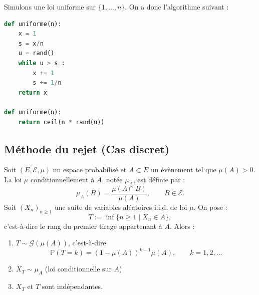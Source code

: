\begin{example}
    Simulons une loi uniforme sur $\{1, \dots, n\}$. 
    On a donc l'algorithme suivant : 

    \begin{lstlisting}[language=Python]
def uniforme(n):
    x = 1 
    s = x/n 
    u = rand() 
    while u > s : 
        x += 1
        s += 1/n 
    return x 

def uniforme(n):
    return ceil(n * rand(u))
    \end{lstlisting}
\end{example}

\subsection{Méthode du rejet (Cas discret)}

\begin{proposition}
    Soit $(E, \mathcal{E}, \mu)$ un espace probabilisé et $A \subset E$ un évènement tel que $\mu(A) > 0$. 
    La loi $\mu$ conditionnellement à $A$, notée $\mu_A$, est définie par :
    \[
        \mu_A(B) = \frac{\mu(A \cap B)}{\mu(A)}, \qquad B \in \mathcal{E}.
    \]
    Soit $(X_n)_{n \geqslant 1}$ une suite de variables aléatoires i.i.d. de loi $\mu$. 
    On pose :
    \[
        T := \inf \{ n \geqslant 1 \mid X_n \in A \},
    \]
    c'est-à-dire le rang du premier tirage appartenant à $A$.
    Alors :
    \begin{enumerate}
        \item $T \sim \mathcal{G}(\mu(A))$, c'est-à-dire
        \[
            \mathbb{P}(T = k) = (1 - \mu(A))^{k-1} \mu(A), \qquad k = 1,2,\dots
        \]
        \item $X_T \sim \mu_A$ (loi conditionnelle sur $A$)
        \item $X_T$ et $T$ sont indépendantes.
    \end{enumerate}
\end{proposition}

